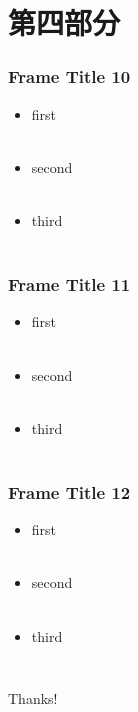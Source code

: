 \documentclass{beamer}
\begin{document}
	\section{第四部分}
	\begin{frame}
		\frametitle{Frame Title 10}
		\begin{itemize} 
			\item first \\~\\
			\item second \\~\\
			\item third \\~\\
		\end{itemize}
	\end{frame}
	\begin{frame}
		\frametitle{Frame Title 11}
		\begin{itemize} 
			\item first \\~\\
			\item second \\~\\
			\item third \\~\\
		\end{itemize}
	\end{frame}
	\begin{frame}
		\frametitle{Frame Title 12}
		\begin{itemize}
			\item first \\~\\
			\item second \\~\\
			\item third \\~\\
		\end{itemize}
	\end{frame}
	\begin{frame}
		\frametitle{}
		\begin{center} %
		{\Huge Thanks!} %
	    \end{center}
	\end{frame}
\end{document}
